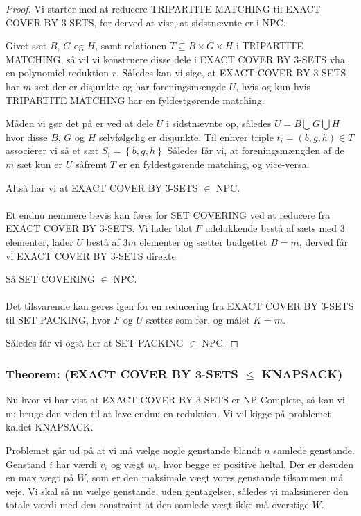 \begin{proof}
 Vi starter med at reducere TRIPARTITE MATCHING til EXACT COVER BY 3-SETS, for derved at vise, at sidstnævnte er i NPC.

 Givet sæt $B$, $G$ og $H$, samt relationen $T \subseteq B \times G \times H$ i TRIPARTITE MATCHING, så vil vi konstruere disse dele i EXACT COVER BY 3-SETS vha. en polynomiel reduktion $r$. Således kan vi sige, at EXACT COVER BY 3-SETS har $m$ sæt der er disjunkte og har foreningsmængde $U$, hvis og kun hvis TRIPARTITE MATCHING har en fyldestgørende matching.

 Måden vi gør det på er ved at dele $U$ i sidstnævnte op, således $U = B \bigcup G \bigcup H$ hvor disse $B$, $G$ og $H$ selvfølgelig er disjunkte. Til enhver triple $t_i=(b,g,h) \in T$ associerer vi så et sæt $S_i=\left\lbrace b,g,h \right\rbrace$
 Således får vi, at foreningsmængden af de $m$ sæt kun er $U$ såfremt $T$ er en fyldestgørende matching, og vice-versa.
 
 Altså har vi at EXACT COVER BY 3-SETS $\in$ NPC.\\
~\\
Et endnu nemmere bevis kan føres for SET COVERING ved at reducere fra EXACT COVER BY 3-SETS. Vi lader blot $F$ udelukkende bestå af sæts med 3 elementer, lader $U$ bestå af $3m$ elementer og sætter budgettet $B=m$, derved får vi EXACT COVER BY 3-SETS direkte. 

Så SET COVERING $\in$ NPC.\\
~\\
Det tilsvarende kan gøres igen for en reducering fra EXACT COVER BY 3-SETS til SET PACKING, hvor $F$ og $U$ sættes som før, og målet $K=m$. 

Således får vi også her at SET PACKING $\in$ NPC.
\end{proof}

\subsubsection{Theorem: (EXACT COVER BY 3-SETS $\leq$ KNAPSACK)}

Nu hvor vi har vist at EXACT COVER BY 3-SETS er NP-Complete, så kan vi nu bruge den viden til at lave endnu en reduktion. Vi vil kigge på problemet kaldet KNAPSACK.

Problemet går ud på at vi må vælge nogle genstande blandt $n$ samlede genstande. Genstand $i$ har værdi $v_i$ og vægt $w_i$, hvor begge er positive heltal. Der er desuden en max vægt på $W$, som er den maksimale vægt vores genstande tilsammen må veje. Vi skal så nu vælge genstande, uden gentagelser, således vi maksimerer den totale værdi med den constraint at den samlede vægt ikke må overstige $W$.


